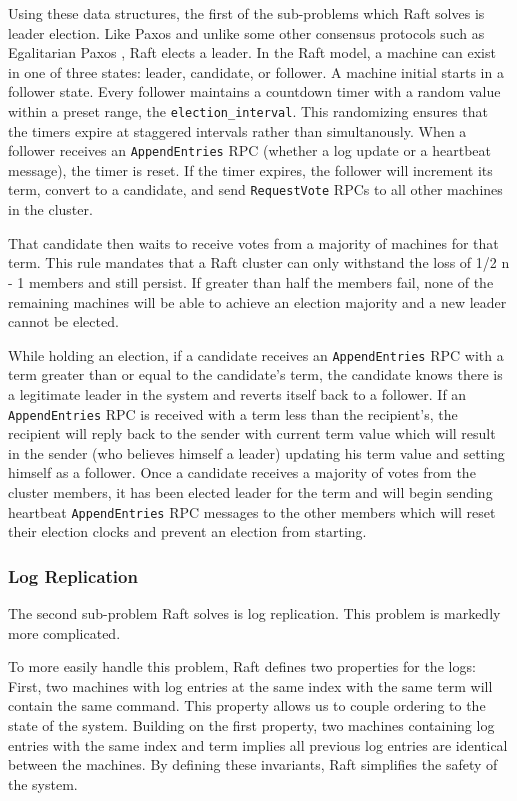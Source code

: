 Using these data structures, the first of the sub-problems which Raft solves is leader election.
Like Paxos and unlike some other consensus protocols such as Egalitarian Paxos \cite{e-paxos}, Raft elects a leader.
In the Raft model, a machine can exist in one of three states: leader, candidate, or follower.
A machine initial starts in a follower state.  Every follower maintains a countdown timer with a random value within a preset range, the \texttt{election\_interval}.  This randomizing ensures that the timers expire at staggered intervals rather than simultanously.  When a follower receives an \texttt{AppendEntries} RPC (whether a log update or a heartbeat message), the timer is reset.  If the timer expires, the follower will increment its term, convert to a candidate, and send \texttt{RequestVote} RPCs to all other machines in the cluster.

That candidate then waits to receive votes from a majority of machines for that term.  This rule mandates that a Raft cluster can only withstand the loss of 1/2 n - 1 members and still persist.  If greater than half the members fail, none of the remaining machines will be able to achieve an election majority and a new leader cannot be elected.
 
While holding an election, if a candidate receives an \texttt{AppendEntries} RPC with a term greater than or equal to the candidate's term, the candidate knows there is a legitimate leader in the system and reverts itself back to a follower.
If an \texttt{AppendEntries} RPC is received with a term less than the recipient's, the recipient will reply back to the sender with current term value which will result in the sender (who believes himself a leader) updating his term value and setting himself as a follower.
Once a candidate receives a majority of votes from the cluster members, it has been elected leader for the term and will begin sending heartbeat \texttt{AppendEntries} RPC messages to the other members which will reset their election clocks and prevent an election from starting.

\subsubsection{Log Replication}

The second sub-problem Raft solves is log replication.
This problem is markedly more complicated.

To more easily handle this problem, Raft defines two properties for the logs:
First, two machines with log entries at the same index with the same term will contain the same command.
This property allows us to couple ordering to the state of the system.
Building on the first property, two machines containing log entries with the same index and term implies all previous log entries are identical between the machines.
By defining these invariants, Raft simplifies the safety of the system.

